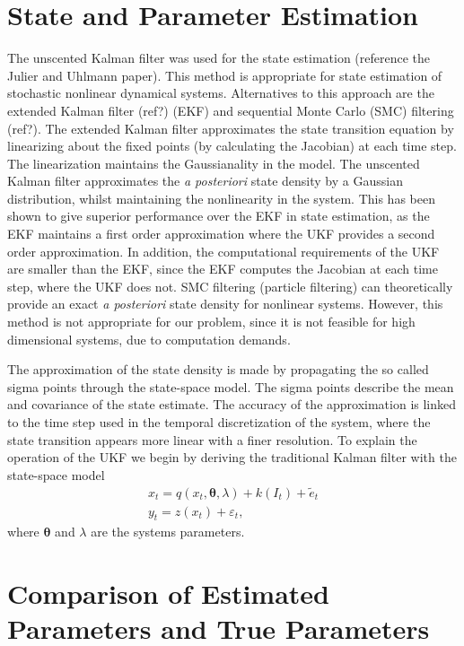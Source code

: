 \documentclass[onecolumn,draftcls]{IEEEtran}
\begin{document}
\section{State and Parameter Estimation}
The unscented Kalman filter was used for the state estimation (reference the Julier and Uhlmann paper). This method is appropriate for state estimation of stochastic nonlinear dynamical systems. Alternatives to this approach are the extended Kalman filter (ref?) (EKF) and sequential Monte Carlo (SMC) filtering (ref?). The extended Kalman filter approximates the state transition equation by linearizing about the fixed points (by calculating the Jacobian) at each time step. The linearization maintains the Gaussianality in the model. The unscented Kalman filter approximates the \emph{a posteriori} state density by a Gaussian distribution, whilst maintaining the nonlinearity in the system. This has been shown to give superior performance over the EKF in state estimation, as the EKF maintains a first order approximation where the UKF provides a second order approximation. In addition, the computational requirements of the UKF are smaller than the EKF, since the EKF computes the Jacobian at each time step, where the UKF does not. SMC filtering (particle filtering) can theoretically provide an exact \emph{a posteriori} state density for nonlinear systems. However, this method is not appropriate for our problem, since it is not feasible for high dimensional systems, due to computation demands.

The approximation of the state density is made by propagating the so called sigma points through the state-space model. The sigma points describe the mean and covariance of the state estimate. The accuracy of the approximation is linked to the time step used in the temporal discretization of the system, where the state transition appears more linear with a finer resolution. To explain the operation of the UKF we begin by deriving the traditional Kalman filter with the state-space model
\begin{eqnarray}
	x_t = q(x_t,\mathbf{\theta},\lambda) + k(I_t) + \tilde{e}_t \\
	y_t = z(x_t) + \varepsilon_t,
\end{eqnarray}
where $\mathbf{\theta}$ and $\lambda$ are the systems parameters. 

\section{Comparison of Estimated Parameters and True Parameters}
\end{document}
